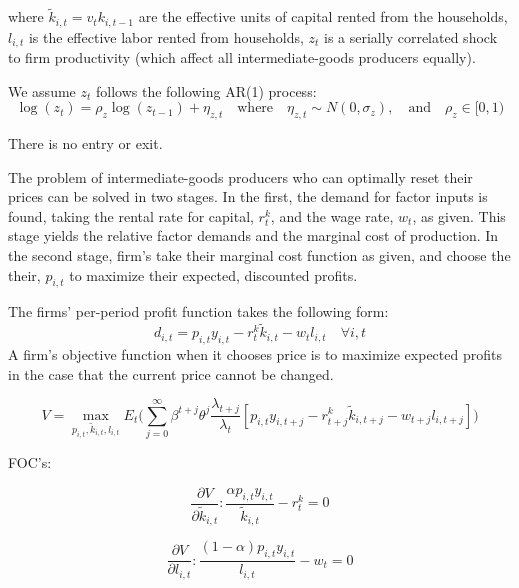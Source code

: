 \documentclass[article,11pt,letterpaper,fleqn]{article}
\theoremstyle{definition}
\numberwithin{equation}{section}
\begin{document}
\noindent\noindent where $\tilde{k}_{i,t}=v_{t}k_{i,t-1}$ are the effective units of capital rented from the households, $l_{i,t}$ is the effective labor rented from households, $z_{t}$ is a serially correlated shock to firm productivity (which affect all intermediate-goods producers equally).

We assume $z_{t}$ follows the following AR(1) process:
\begin{equation}\label{EqProdShock}
   \log(z_{t}) = \rho_z\log(z_{t-1}) + \eta_{z,t} \quad\text{where}\quad\eta_{z,t}\sim N(0,\sigma_z), \quad\text{and}\quad \rho_z\in[0,1)
\end{equation}

There is no entry or exit.

The problem of intermediate-goods producers who can optimally reset their prices can be solved in two stages.  In the first, the demand for factor inputs is found, taking the rental rate for capital, $r_{t}^{k}$, and the wage rate, $w_{t}$, as given.  This stage yields the relative factor demands and the marginal cost of production.  In the second stage, firm's take their marginal cost function as given, and choose the their, $p_{i,t}$ to maximize their expected, discounted profits.

The firms' per-period profit function takes the following form:
\begin{equation}
   d_{i,t} = p_{i,t}y_{i,t} - r_t^k\tilde{k}_{i,t} - w_t l_{i,t} \quad\forall i,t
\end{equation}
A firm's objective function when it chooses price is to maximize expected profits in the case that the current price cannot be changed.

\begin{equation}
V=\max_{p_{i,t},\tilde{k}_{i,t},l_{i,t}}E_{t}\Biggl(\sum_{j=0}^{\infty}\beta^{t+j}\theta^{j}\frac{\lambda_{t+j}}{\lambda_{t}}\left[p_{i,t}y_{i,t+j}-r_{t+j}^{k}\tilde{k}_{i,t+j}-w_{t+j}l_{i,t+j}\right]\Biggr)
\end{equation}

FOC's:

\begin{equation}
\label{foc_int_k}
\frac{\partial V}{\partial \tilde{k}_{i,t}}:\frac{\alpha p_{i,t}y_{i,t}}{\tilde{k}_{i,t}}-r_{t}^{k}=0
\end{equation}

\begin{equation}
\label{foc_int_l}
\frac{\partial V}{\partial l_{i,t}}:\frac{(1-\alpha) p_{i,t}y_{i,t}}{l_{i,t}}-w_{t}=0
\end{equation}
\end{document}

